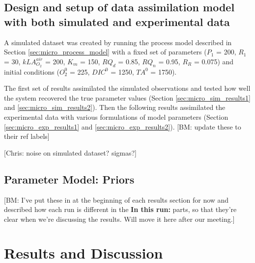\documentclass{ruthesis}
\begin{document}
\subsection{Design and setup of data assimilation model with both simulated and experimental data}

A simulated dataset was created by running the process model described in Section \ref{sec:micro_process_model} with a fixed set of parameters ($P_1$ = 200, $R_1$ = 30, $kLA_{O_2}^{air}$ = 200, $K_m$ = 150, $RQ_d$ = 0.85, $RQ_n$ = 0.95, $R_R$ = 0.075) and initial conditions ($O_2^0$ = 225, $DIC^0$ = 1250, $TA^0$ = 1750). 

The first set of results assimilated the simulated observations and tested how well the system recovered the true parameter values (Section \ref{sec:micro_sim_results1} and \ref{sec:micro_sim_results2}). Then the following results assimilated the experimental data with various formulations of model parameters (Section \ref{sec:micro_exp_results1} and \ref{sec:micro_exp_results2}). [BM: update these to their ref labels]

[Chris: noise on simulated dataset? sigmas?]

\subsection{Parameter Model: Priors} \label{sec:micro_parameter_model}
[BM: I've put these in at the beginning of each results section for now and described how each run is different in the \textbf{In this run:} parts, so that they're clear when we're discussing the results. Will move it here after our meeting.]



\FloatBarrier

\section{Results and Discussion}
\end{document}
